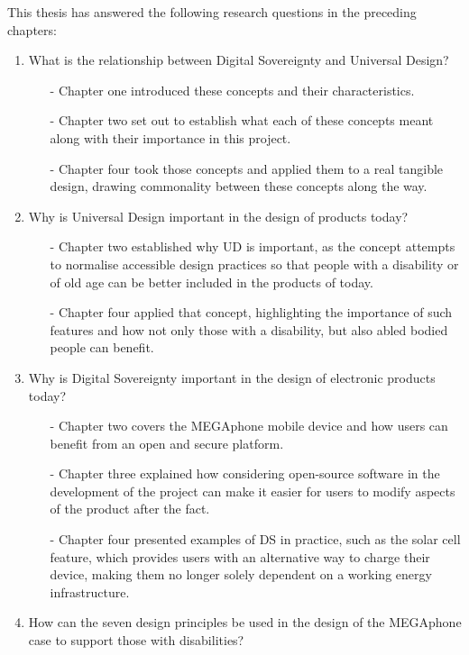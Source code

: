 This thesis has answered the following research questions in the preceding chapters:
\begin{enumerate}
    \item What is the relationship between Digital Sovereignty and Universal Design?
        \begin{enumerate}
        \item[-] Chapter one introduced these concepts and their characteristics.
        \item[-] Chapter two set out to establish what each of these concepts meant along with their importance in this project.
        \item[-] Chapter four took those concepts and applied them to a real tangible design, drawing commonality between these concepts along the way.
        \end{enumerate} 
    \item Why is Universal Design important in the design of products today?
        \begin{enumerate}
        \item[-] Chapter two established why UD is important, as the concept attempts to normalise accessible design practices so that people with a disability or of old age can be better included in the products of today.
        \item[-] Chapter four applied that concept, highlighting the importance of such features and how not only those with a disability, but also abled bodied people can benefit. 
        \end{enumerate}
    \item Why is Digital Sovereignty important in the design of electronic products today?
        \begin{enumerate}
        \item[-] Chapter two covers the MEGAphone mobile device and how users can benefit from an open and secure platform.
        \item[-] Chapter three explained how considering open-source software in the development of the project can make it easier for users to modify aspects of the product after the fact.
        \item[-] Chapter four presented examples of DS in practice, such as the solar cell feature, which provides users with an alternative way to charge their device, making them no longer solely dependent on a working energy infrastructure.
        \end{enumerate} 
    \item How can the seven design principles be used in the design of the MEGAphone case to support those with disabilities?

\end{enumerate}
